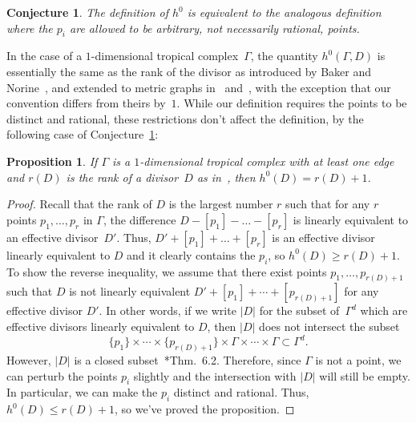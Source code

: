 \documentclass[11pt]{amsart}
\newtheorem{prop}[thm]{Proposition}
\newtheorem{conj}[thm]{Conjecture}
\theoremstyle{definition}
\begin{document}
\begin{conj}\label{conj:non-rational-points}
The definition of $h^0$ is equivalent to the analogous definition where the
$p_i$ are allowed to be arbitrary, not necessarily rational, points.
\end{conj}

In the case of a $1$-dimensional tropical complex~$\Gamma$, the quantity
$h^0(\Gamma, D)$ is essentially the same as the rank of the divisor as
introduced by Baker and Norine~\cite{baker-norine}, and extended to metric
graphs in~\cite{gathmann-kerber} and~\cite{mikhalkin-zharkov}, with the
exception that our convention differs from theirs by~$1$. While our definition
requires the points to be distinct and rational, these restrictions don't affect
the definition, by the following case of
Conjecture~\ref{conj:non-rational-points}:

\begin{prop}\label{p:agree-curve}
If $\Gamma$ is a $1$-dimensional tropical complex with at least one edge and
$r(D)$ is the rank of a divisor~$D$ as in~\cite{baker-norine}, then $h^0(D) =
r(D) + 1$.
\end{prop}

\begin{proof}
Recall that the rank of $D$ is the largest number $r$ such that for any $r$
points $p_1, \ldots, p_r$ in $\Gamma$, the difference $D - [p_1] - \ldots -
[p_r]$
is linearly equivalent to an effective divisor~$D'$. Thus, $D' + [p_1] + \ldots
+ [p_r]$ is an effective divisor linearly equivalent to $D$ and it clearly
contains
the $p_i$, so $h^0(D) \geq r(D) + 1$.
To show the reverse inequality, we assume that
 there exist points $p_1, \ldots, p_{r(D) + 1}$ such
that $D$ is not linearly equivalent $D' + [p_1]
+ \cdots + [p_{r(D) + 1}]$ for any effective divisor $D'$. In other words, if we
write $\lvert D \rvert$ for the subset of~$\Gamma^d$ which are effective
divisors linearly equivalent to $D$,
then $\lvert D \rvert$ does not intersect the subset
\begin{equation*}
\{p_1\} \times \cdots \times \{p_{r(D) + 1}\} \times \Gamma \times \cdots \times
\Gamma \subset \Gamma^d.
\end{equation*}
However, $\lvert D \rvert$ is a closed
subset~\cite{mikhalkin-zharkov}*{Thm.~6.2}. Therefore, since $\Gamma$ is not a
point, we can perturb the points $p_i$ slightly and the intersection with
$\lvert D \rvert$ will still be empty. In particular, we can make the $p_i$
distinct and rational. Thus, $h^0(D) \leq r(D) + 1$, so we've proved
the proposition.
\end{proof}
\end{document}
